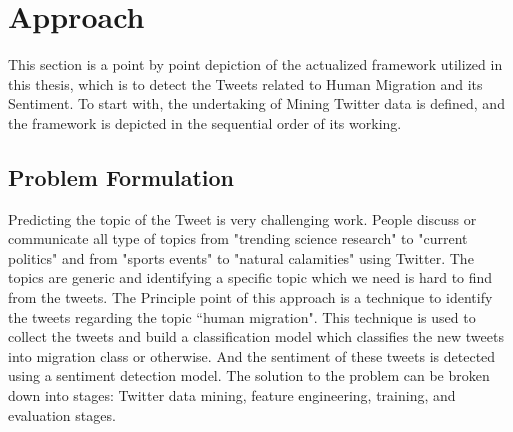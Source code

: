 \chapter{Approach}\label{chap:approach}
This section is a point by point depiction of the actualized framework utilized in this thesis, which is to detect the Tweets related to Human Migration and its Sentiment. To start with, the undertaking of Mining Twitter data is defined, and the framework is depicted in the sequential order of its working.

\section{Problem Formulation}

Predicting the topic of the Tweet is very challenging work. People discuss or communicate all type of topics from "trending science research" to "current politics" and from "sports events" to "natural calamities" using Twitter. The topics are generic and identifying a specific topic which we need is hard to find from the tweets. The  
Principle point of this approach is a technique to identify the tweets regarding the topic ``human migration". This technique is used to collect the tweets and build a classification model which classifies the new tweets into migration class or otherwise. And the sentiment of these tweets is detected using a sentiment detection model. The solution to the problem can be broken down into stages: Twitter data mining, feature engineering, training, and evaluation stages.


